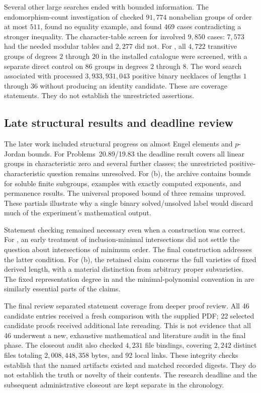 Several other large searches ended with bounded information. The
endomorphism-count investigation of  checked \(91{,}774\)
nonabelian groups of order at most \(511\), found no equality example,
and found \(469\) cases contradicting a stronger inequality. The
character-table screen for  involved \(9{,}850\) cases:
\(7{,}573\) had the needed modular tables and \(2{,}277\) did not.
For , all \(4{,}722\) transitive groups of degrees \(2\)
through \(20\) in the installed catalogue were screened, with a separate
direct control on \(86\) groups in degrees \(2\) through \(8\).
The word search associated with  processed
\(3{,}933{,}931{,}043\) positive binary necklaces of lengths \(1\)
through \(36\) without producing an identity candidate. These are
coverage statements. They do not establish the unrestricted assertions.

\subsection{Late structural results and deadline review}

The later work included structural progress on almost Engel elements
and \(p\)-Jordan bounds. For Problems~20.89/19.83 the deadline result
covers all linear groups in characteristic zero and several further
classes; the unrestricted positive-characteristic question remains
unresolved. For (b), the archive contains bounds for
soluble finite subgroups, examples with exactly computed exponents,
and permanence results. The universal proposed bound of three remains
unproved. These partials illustrate why a single binary solved/unsolved
label would discard much of the experiment's mathematical output.

Statement checking remained necessary even when a construction was
correct. For , an early treatment of inclusion-minimal
intersections did not settle the question about intersections of
minimum order. The final construction addresses the latter condition.
For (b), the retained claim concerns the full varieties of
fixed derived length, with a material distinction from arbitrary proper
subvarieties. The fixed representation degree in  and the
minimal-polynomial convention in  are similarly essential
parts of the claims.

The final review separated statement coverage from deeper proof review.
All 46 candidate entries received a fresh comparison with the supplied
PDF; 22 selected candidate proofs received additional late rereading.
This is not evidence that all 46 underwent a new, exhaustive
mathematical and literature audit in the final phase. The closeout audit
also checked \(4{,}231\) file bindings, covering \(2{,}242\) distinct
files totaling \(2{,}008{,}448{,}358\) bytes, and 92 local links.
These integrity checks establish that the named artifacts existed and
matched recorded digests. They do not establish the truth or novelty of
their contents. The research deadline and the subsequent administrative
closeout are kept separate in the chronology.
